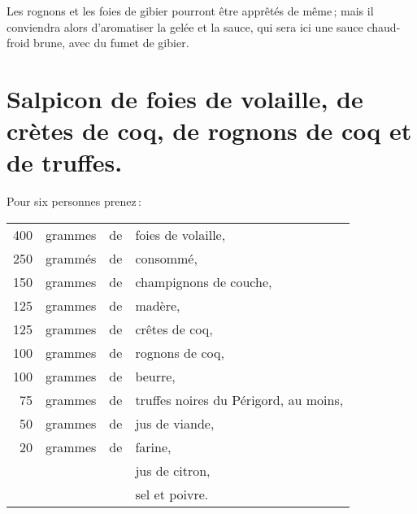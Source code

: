 \sk

Les rognons et les foies de gibier pourront être apprêtés de même ; mais il
conviendra alors d'aromatiser la gelée et la sauce, qui sera ici une sauce
chaud-froid brune, avec du fumet de gibier.

\section*{\centering Salpicon de foies de volaille, de crètes de coq, de rognons de coq et de truffes.}
{}

Pour six personnes prenez :

\medskip

\footnotesize
\begin{longtable}{rrrp{16em}}
    400 & grammes & de & foies de volaille,                                                               \\
    250 & grammés & de & consommé,                                                                        \\
    150 & grammes & de & champignons de couche,                                                           \\
    125 & grammes & de & madère,                                                                          \\
    125 & grammes & de & crêtes de coq,                                                                   \\
    100 & grammes & de & rognons de coq,                                                                  \\
    100 & grammes & de & beurre,                                                                          \\
     75 & grammes & de & truffes noires du Périgord, au moins,                                            \\
     50 & grammes & de & jus de viande,                                                                   \\
     20 & grammes & de & farine,                                                                          \\
        &         &    & jus de citron,                                                                   \\
        &         &    & sel et poivre.                                                                   \\
\end{longtable}
\normalsize

